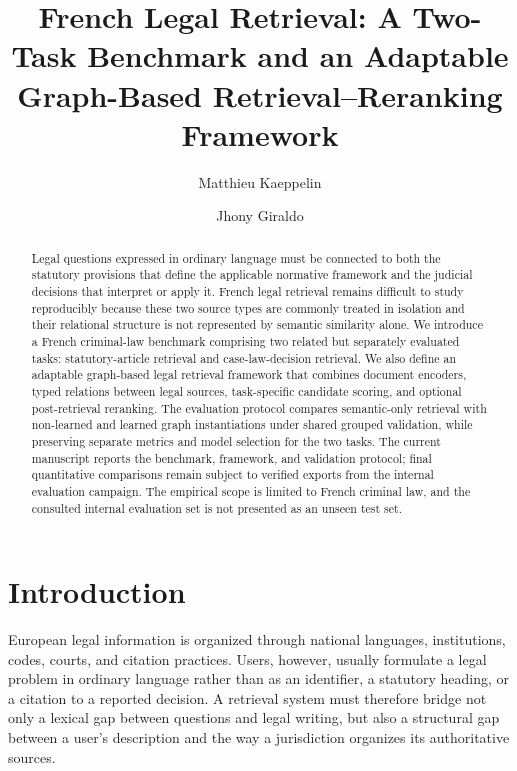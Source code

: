 \documentclass[runningheads]{llncs}
\begin{document}
\title{French Legal Retrieval: A Two-Task Benchmark and an Adaptable Graph-Based Retrieval--Reranking Framework}

\author{Matthieu Kaeppelin \and Jhony Giraldo}
\institute{}

\maketitle

\begin{abstract}
Legal questions expressed in ordinary language must be connected to both the statutory provisions that define the applicable normative framework and the judicial decisions that interpret or apply it. French legal retrieval remains difficult to study reproducibly because these two source types are commonly treated in isolation and their relational structure is not represented by semantic similarity alone. We introduce a French criminal-law benchmark comprising two related but separately evaluated tasks: statutory-article retrieval and case-law-decision retrieval. We also define an adaptable graph-based legal retrieval framework that combines document encoders, typed relations between legal sources, task-specific candidate scoring, and optional post-retrieval reranking. The evaluation protocol compares semantic-only retrieval with non-learned and learned graph instantiations under shared grouped validation, while preserving separate metrics and model selection for the two tasks. The current manuscript reports the benchmark, framework, and validation protocol; final quantitative comparisons remain subject to verified exports from the internal evaluation campaign. The empirical scope is limited to French criminal law, and the consulted internal evaluation set is not presented as an unseen test set.
\end{abstract}

\section{Introduction}

European legal information is organized through national languages, institutions, codes, courts, and citation practices. Users, however, usually formulate a legal problem in ordinary language rather than as an identifier, a statutory heading, or a citation to a reported decision. A retrieval system must therefore bridge not only a lexical gap between questions and legal writing, but also a structural gap between a user's description and the way a jurisdiction organizes its authoritative sources.
\end{document}
